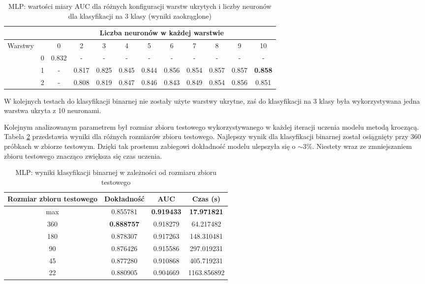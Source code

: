 \documentclass[a4paper, twoside, 11pt, openright]{article}
\begin{document}
\begin{table}[H]
    \centering
    \begin{tabular}{|c|c|c|c|c|c|c|c|c|c|c|c|}
        \hline
         & &  \multicolumn{10}{c|}{Liczba neuronów w każdej warstwie}  \\ \hline
        \multirow{4}{*}{Warstwy} & & 0 & 2 & 3 & 4 & 5 & 6 & 7 & 8 & 9 & 10  \\ \cline{2 - 12}
			& 0 & 0.832 & - & - & - & - & - & - & - & - & - \\ \cline{2 - 12} 
			& 1 & - &  0.817 &  0.825 &  0.845 &  0.844 &  0.856 &  0.854 &  0.857 &  0.857 & \textbf{0.858} \\ \cline{2 - 12} 
			& 2 & - & 0.808 &   0.819 &   0.847 &   0.846 &   0.843 &   0.849 &   0.854 &   0.856 &   0.851  \\ \cline{2 - 12} \hline

    \end{tabular}
    \caption{MLP: wartości miary AUC dla różnych konfiguracji warstw ukrytych i liczby neuronów dla klasyfikacji na 3 klasy (wyniki zaokrąglone)}
    \label{tab:nn_layers_discrete}
\end{table}

W kolejnych testach do klasyfikacji binarnej nie zostały użyte warstwy ukrytne, zaś do klasyfikacji na 3 klasy była wykorzystywana jedna warstwa ukryta z 10 neuronami.

\bigskip

Kolejnym analizowanym parametrem był rozmiar zbioru testowego wykorzystywanego w każdej iteracji uczenia modelu metodą kroczącą. Tabela \ref{tab:nn_walk_forward_test_binary} przedstawia wyniki dla różnych rozmiarów zbioru testowego. Najlepszy wynik dla klasyfikacji binarnej został osiągnięty przy 360 próbkach w zbiorze testowym. Dzięki tak prostemu zabiegowi dokładność modelu ulepszyła się o $\sim 3\%$. Niestety wraz ze zmniejszaniem zbioru testowego znacząco zwiększa się czas uczenia. 

\begin{table}[H]
    \centering
    \begin{tabular}{|c|c|c|c|}
    \hline
        \textbf{Rozmiar zbioru testowego} & \textbf{Dokładność} &  \textbf{AUC} &  \textbf{Czas (s)} \\ \hline 
max                           &  0.855781 &  \textbf{0.919433} &   \textbf{17.971821} \\  \hline
360                         &  \textbf{0.888757} &  0.918279 &   64.217482 \\  \hline
180                         &  0.878307 &  0.917263 &  148.310481 \\  \hline
90                          &  0.876426 &  0.915586 &  297.019231 \\ \hline
45                          &  0.877280 &  0.910868 &   405.719231 \\ \hline
22                          &  0.880905 &  0.904669 &  1163.856892 \\ \hline
    \end{tabular}
    \caption{MLP: wyniki klasyfikacji binarnej w zależności od rozmiaru zbioru testowego}
    \label{tab:nn_walk_forward_test_binary}
\end{table}
\end{document}
